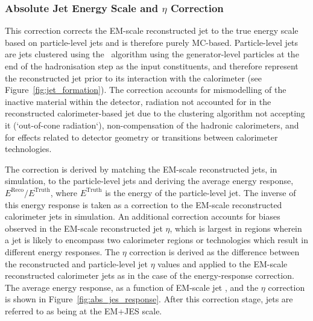 \subsubsection{Absolute Jet Energy Scale and $\eta$ Correction}
\label{sec:jet_eta_corr}

This correction corrects the EM-scale reconstructed jet to the true energy scale based on particle-level
jets and is therefore purely MC-based.
Particle-level jets are jets clustered using the \antikt~algorithm using the generator-level
particles at the end of the hadronisation step as the input constituents, and therefore represent the reconstructed jet prior to
its interaction with the calorimeter (see Figure~\ref{fig:jet_formation}).
The correction accounts for mismodelling of the inactive material within the detector, radiation not accounted for
in the reconstructed calorimeter-based jet due to the clustering algorithm not accepting it (`out-of-cone radiation`),
non-compensation of the hadronic calorimeters, and for effects
related to detector geometry or transitions between calorimeter technologies.

The correction is derived by matching the EM-scale reconstructed jets, in simulation, to the particle-level
jets and deriving the average energy response, $E^{\text{Reco}} / E^{\text{Truth}}$, where $E^{\text{Truth}}$ is the
energy of the particle-level jet.
The inverse of this energy response is taken as a correction to the EM-scale reconstructed calorimeter jets in simulation.
An additional correction accounts for biases observed in the EM-scale reconstructed jet $\eta$, which is largest
in regions wherein a jet is likely to encompass two calorimeter regions or technologies which result in different
energy responses.
The $\eta$ correction is derived as the difference between the reconstructed and particle-level jet $\eta$ values and
applied to the EM-scale reconstructed calorimeter jets as in the case of the energy-response correction.
The average energy response, as a function of EM-scale jet \pT, and the $\eta$ correction is shown
in Figure~\ref{fig:abs_jes_response}.
After this correction stage, jets are referred to as being at the EM+JES scale.

